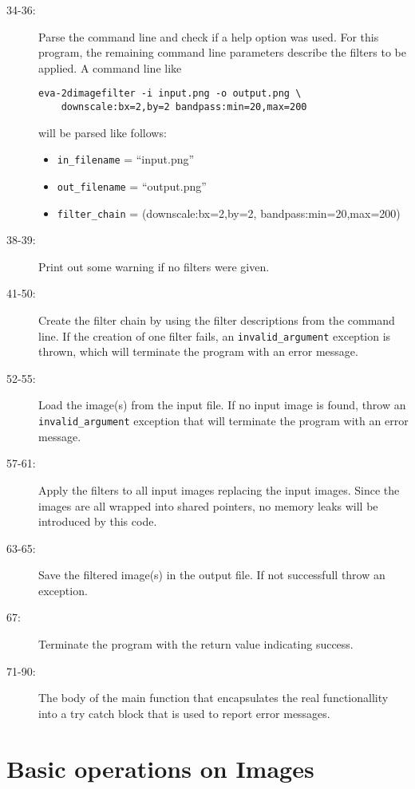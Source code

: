\documentclass[english, 10pt, a4paper,headsepline,openany]{scrbook}
\begin{document}
\begin{description}
\item [34-36:] Parse the command line and check if a help option was used. 
     For this program, the remaining command line parameters describe the filters to be applied. 
     A command line like 
     \lstset{language=bash,numbers=none}
     \begin{lstlisting}
eva-2dimagefilter -i input.png -o output.png \
    downscale:bx=2,by=2 bandpass:min=20,max=200
    \end{lstlisting}
      will be parsed like follows:
      \begin{itemize}
      \item  \texttt{in\_filename} = ``input.png''
      \item  \texttt{out\_filename} = ``output.png''
      \item  \texttt{filter\_chain} = (downscale:bx=2,by=2, bandpass:min=20,max=200)
      \end{itemize}

\item [38-39:] Print out some warning if no filters were given. 

\item [41-50:] Create the filter chain by using the filter descriptions from the command line. 
       If the creation of one filter fails, an \texttt{invalid\_argument} exception is thrown, 
        which will terminate the  program with an error message. 
\item [52-55:] Load the image(s) from the input file. 
       If no input image is found, throw an \texttt{invalid\_argument} exception that will terminate 
         the program with an error message. 
\item [57-61:] Apply the filters to all input images replacing the input images. 
       Since the images are all wrapped into shared pointers, no memory leaks will be introduced by this code. 
\item [63-65:] Save the filtered image(s) in the output file. If not successfull throw an exception.
\item [67:] Terminate the program with the return value indicating success.
\item [71-90:] The body of the main function that encapsulates the real functionallity into a try 
      catch block that is used to report error messages. 
\end{description}

\chapter{Basic operations on Images}
\end{document}
